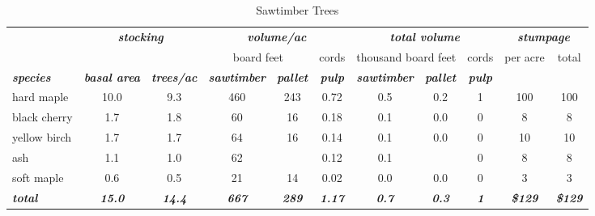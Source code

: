 \documentclass[landscape]{article}
\begin{document}
\begin{table}[H]

\caption{\label{tab:unnamed-chunk-61}Sawtimber Trees}
\fontsize{10}{12}\selectfont
\begin{tabular}[t]{lcccccccccc}
\toprule
\multicolumn{1}{c}{\em{\textbf{ }}} & \multicolumn{2}{c}{\em{\textbf{stocking}}} & \multicolumn{3}{c}{\em{\textbf{volume/ac }}} & \multicolumn{3}{c}{\em{\textbf{total volume}}} & \multicolumn{2}{c}{\em{\textbf{stumpage}}} \\
\cmidrule(l{3pt}r{3pt}){2-3} \cmidrule(l{3pt}r{3pt}){4-6} \cmidrule(l{3pt}r{3pt}){7-9} \cmidrule(l{3pt}r{3pt}){10-11}
\multicolumn{3}{c}{ } & \multicolumn{2}{c}{board feet} & \multicolumn{1}{c}{cords} & \multicolumn{2}{c}{thousand board feet} & \multicolumn{1}{c}{cords} & \multicolumn{1}{c}{per acre} & \multicolumn{1}{c}{total} \\
\cmidrule(l{3pt}r{3pt}){4-5} \cmidrule(l{3pt}r{3pt}){6-6} \cmidrule(l{3pt}r{3pt}){7-8} \cmidrule(l{3pt}r{3pt}){9-9} \cmidrule(l{3pt}r{3pt}){10-10} \cmidrule(l{3pt}r{3pt}){11-11}
\rowcolor[HTML]{DCDCDC}  \em{\textbf{species}} & \em{\textbf{basal area}} & \em{\textbf{trees/ac}} & \em{\textbf{sawtimber}} & \em{\textbf{pallet}} & \em{\textbf{pulp}} & \em{\textbf{sawtimber}} & \em{\textbf{pallet}} & \em{\textbf{pulp}} & \em{\textbf{ }} & \em{\textbf{ }}\\
\midrule
\rowcolor{gray!6}  hard maple & 10.0 & 9.3 & 460 & 243 & 0.72 & 0.5 & 0.2 & 1 & 100 & 100\\
 
black cherry & 1.7 & 1.8 & 60 & 16 & 0.18 & 0.1 & 0.0 & 0 & 8 & 8\\
 
\rowcolor{gray!6}  yellow birch & 1.7 & 1.7 & 64 & 16 & 0.14 & 0.1 & 0.0 & 0 & 10 & 10\\
 
ash & 1.1 & 1.0 & 62 &  & 0.12 & 0.1 &  & 0 & 8 & 8\\
 
\rowcolor{gray!6}  soft maple & 0.6 & 0.5 & 21 & 14 & 0.02 & 0.0 & 0.0 & 0 & 3 & 3\\
 
\rowcolor[HTML]{DCDCDC}  \em{\textbf{total}} & \em{\textbf{15.0}} & \em{\textbf{14.4}} & \em{\textbf{667}} & \em{\textbf{289}} & \em{\textbf{1.17}} & \em{\textbf{0.7}} & \em{\textbf{0.3}} & \em{\textbf{1}} & \em{\textbf{\$129}} & \em{\textbf{\$129}}\\
\bottomrule
\end{tabular}
\end{table}
\end{document}
